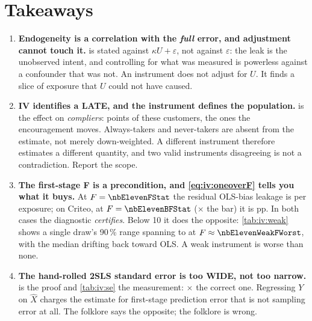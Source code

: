 \section{Takeaways}
\label{sec:iv:take}

\begin{enumerate}[leftmargin=*, itemsep=.45em]
  \item \textbf{Endogeneity is a correlation with the \emph{full} error, and adjustment cannot
        touch it.}  is stated against $\kappa U + \varepsilon$, not against
        $\varepsilon$: the leak is the unobserved intent, and controlling for what was measured is
        powerless against a confounder that was not. An instrument does not adjust for $U$. It finds
        a slice of exposure that $U$ could not have caused.

  \item \textbf{IV identifies a LATE, and the instrument defines the population.} 
        is the effect on \emph{compliers}: \nbElevenFsShift{} points of these customers, the ones
        the encouragement moves. Always-takers and never-takers are absent from the estimate, not
        merely down-weighted. A different instrument therefore estimates a different quantity, and
        two valid instruments disagreeing is not a contradiction. Report the scope.

  \item \textbf{The first-stage F is a precondition, and \cref{eq:iv:oneoverF} tells you what it
        buys.} At $F = \nbElevenFStat$ the residual OLS-bias leakage is \eur{\nbElevenFLeak} per
        exposure; on Criteo, at $F = \nbElevenBFStat$ (\nbElevenBFOverBar$\times$ the bar) it
        is \nbElevenBFLeak{} pp. In both cases the diagnostic \emph{certifies}. Below 10 it does the
        opposite: \cref{tab:iv:weak} shows a single draw's 90\,\% range spanning \eur{\nbElevenWeakLo}
        to \eur{\nbElevenWeakHi} at $F \approx \nbElevenWeakFWorst$, with the median drifting back
        toward OLS. A weak instrument is worse than none.

  \item \textbf{The hand-rolled 2SLS standard error is too WIDE, not too narrow.} 
        is the proof and \cref{tab:iv:se} the measurement: \nbElevenSeHandRatio$\times$ the correct
        one. Regressing $Y$ on $\hat X$ charges the estimate for first-stage prediction error that is
        not sampling error at all. The folklore says the opposite; the folklore is wrong.


\end{enumerate}
